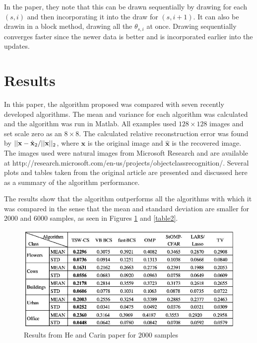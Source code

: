 \documentclass{IEEEtran}
\begin{document}
In the paper, they note that this can be drawn sequentially by drawing
for each $(s,i)$ and then incorporating it into the draw for $(s,i+1)$.  It can also be drawin
in a block method, drawing all the $\theta_{s,i}$ at once.  Drawing
sequentially converges faster since the newer data is better and is
incorporated earlier into the updates.

\section{Results}

In this paper, the algorithm proposed was compared with seven recently
developed algorithms.  The mean and variance for each algorithm was
calculated and the algorithm was run in Matlab.  All examples used
$128\times128$ images and set scale zero as an $8\times8$.  The
calculated relative reconstruction error was found by
$||\mathbf{x}-\hat{\mathbf{x}}\\_2/||\mathbf{x}||_2$, where
    $\mathbf{x}$ is the original image and $\hat{\mathbf{x}}$ is the
recovered image.  The images used were natural images from Microsoft
Research and are available at http://research.microsoft.com/en-us/projects/objectclassrecognition/.
Several plots and tables taken from the original article are presented
and discussed here as a summary of the algorithm performance.

The results show that the algorithm outperforms all the algorithms
with which it was compared in the sense that the mean and standard
deviation are smaller for $2000$ and $6000$ samples, as seen in
Figures \ref{table1} and \ref{table2}.

\begin{figure}[ht]
  \centering
  \includegraphics[width=1\linewidth]{he_carin_results_m2000}
  \caption{Results from He and Carin paper for $2000$ samples}
  \label{table1}
\end{figure}
\end{document}

